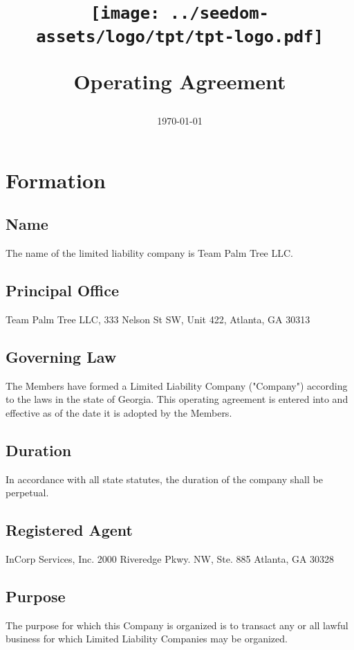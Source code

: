 \documentclass[11pt]{article}
\begin{document}
\title{%
\begin{center}
\texttt{[image: ../seedom-assets/logo/tpt/tpt-logo.pdf]}
\end{center}
\huge Operating Agreement \\[1mm]}
\date{\today}
\maketitle
\pagebreak

\tableofcontents
\pagebreak

\section{Formation}

\subsection{Name}
The name of the limited liability company is Team Palm Tree LLC.

\subsection{Principal Office}
Team Palm Tree LLC, 333 Nelson St SW, Unit 422, Atlanta, GA 30313

\subsection{Governing Law}
The Members have formed a Limited Liability Company ("Company") according to the laws in the state of Georgia. This operating agreement is entered into and effective as of the date it is adopted by the Members.

\subsection{Duration}
In accordance with all state statutes, the duration of the company shall be perpetual.

\subsection{Registered Agent}
InCorp Services, Inc.
2000 Riveredge Pkwy. NW, Ste. 885
Atlanta, GA 30328

\subsection{Purpose}
The purpose for which this Company is organized is to transact any or all lawful business for which Limited Liability Companies may be organized.
\end{document}
